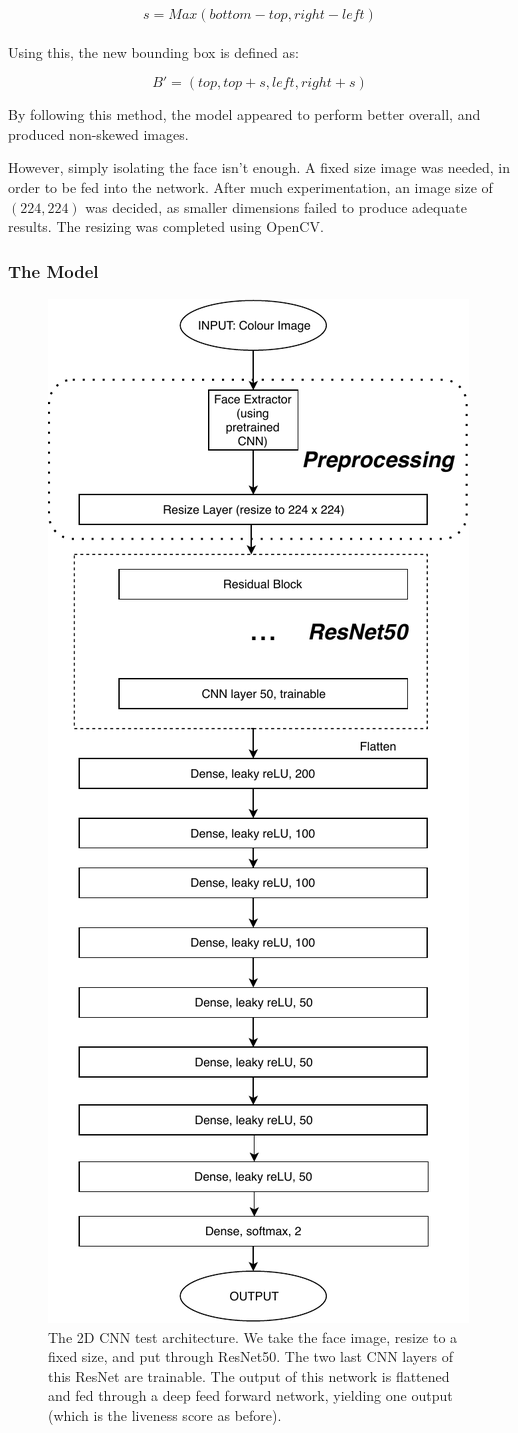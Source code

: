 \documentclass[11pt,a4paper]{article}
\begin{document}
                $$s = Max(bottom - top, right - left)$$\\


                Using this, the new bounding box is defined as:


                $$B' = (top, top + s, left, right + s)$$


                By following this method, the model appeared to perform better overall, and produced non-skewed images.

                However, simply isolating the face isn't enough. A fixed size image was needed, in order to be fed into the network. After much experimentation, an image size of $(224, 224)$
                was decided, as smaller dimensions failed to produce adequate results. The resizing was completed using OpenCV.

                
            \subsubsection{The Model}
                    
                \begin{figure}
                    \centering
                    \includegraphics[width=0.5\linewidth]{2DCNNArchitecture.pdf}
                    \caption{The 2D CNN test architecture. We take the face image, resize to a fixed size, and put through ResNet50. The two last CNN layers
                    of this ResNet are trainable. The output of this network is flattened and fed through a deep feed forward network, yielding one output (which is the
                    liveness score as before).}
                    \label{2DCNNArchitecture}
                \end{figure}
\end{document}
